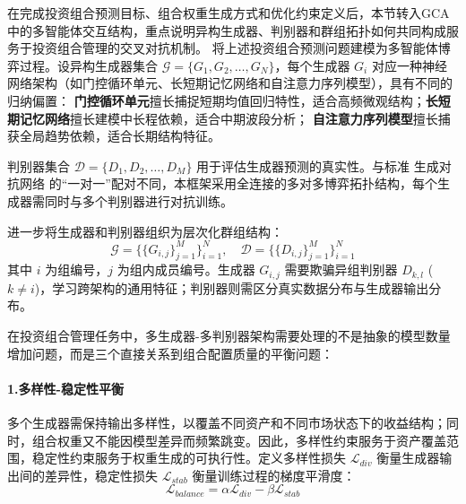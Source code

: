 在完成投资组合预测目标、组合权重生成方式和优化约束定义后，本节转入GCA中的多智能体交互结构，重点说明异构生成器、判别器和群组拓扑如何共同构成服务于投资组合管理的交叉对抗机制。
将上述投资组合预测问题建模为多智能体博弈过程。设异构生成器集合 $\mathcal{G} = \{G_1, G_2, \ldots, G_N\}$，每个生成器 $G_i$ 对应一种神经网络架构（如门控循环单元、长短期记忆网络和自注意力序列模型），具有不同的归纳偏置：
\textbf{门控循环单元}擅长捕捉短期均值回归特性，适合高频微观结构；\textbf{长短期记忆网络}擅长建模中长程依赖，适合中期波段分析；
 \textbf{自注意力序列模型}擅长捕获全局趋势依赖，适合长期结构特征。


判别器集合 $\mathcal{D} = \{D_1, D_2, \ldots, D_M\}$ 用于评估生成器预测的真实性。与标准 生成对抗网络 的“一对一”配对不同，本框架采用全连接的多对多博弈拓扑结构，每个生成器需同时与多个判别器进行对抗训练。

进一步将生成器和判别器组织为层次化群组结构：
\[
\mathcal{G} = \{ \{ G_{i,j} \}_{j=1}^{M} \}_{i=1}^{N}, \quad
\mathcal{D} = \{ \{ D_{i,j} \}_{j=1}^{M} \}_{i=1}^{N}
\]
其中 $i$ 为组编号，$j$ 为组内成员编号。生成器 $G_{i,j}$ 需要欺骗异组判别器 $D_{k,l}$ ($k \neq i$)，学习跨架构的通用特征；判别器则需区分真实数据分布与生成器输出分布。


在投资组合管理任务中，多生成器-多判别器架构需要处理的不是抽象的模型数量增加问题，而是三个直接关系到组合配置质量的平衡问题：

\paragraph{1.多样性-稳定性平衡} 多个生成器需保持输出多样性，以覆盖不同资产和不同市场状态下的收益结构；同时，组合权重又不能因模型差异而频繁跳变。因此，多样性约束服务于资产覆盖范围，稳定性约束服务于权重生成的可执行性。定义多样性损失 $\mathcal{L}_{div}$ 衡量生成器输出间的差异性，稳定性损失 $\mathcal{L}_{stab}$ 衡量训练过程的梯度平滑度：
\[
\mathcal{L}_{balance} = \alpha \mathcal{L}_{div} - \beta \mathcal{L}_{stab}
\]

